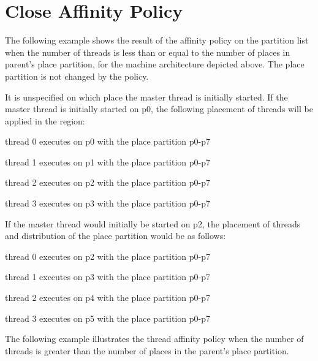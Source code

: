 \section{Close Affinity Policy}

The following example shows the result of the  affinity policy on 
the partition list when the number of threads is less than or equal to the number 
of places in parent's place partition, for the machine architecture depicted above. 
The place partition is not changed by the  policy.



It is unspecified on which place the master thread is initially started. If the 
master thread is initially started on p0, the following placement of threads will 
be applied in the  region:

\begin{compactitem}
\item thread 0 executes on p0 with the place partition p0-p7

\item thread 1 executes on p1 with the place partition p0-p7

\item thread 2 executes on p2 with the place partition p0-p7

\item thread 3 executes on p3 with the place partition p0-p7
\end{compactitem}

If the master thread would initially be started on p2, the placement of threads 
and distribution of the place partition would be as follows:

\begin{compactitem}
\item thread 0 executes on p2 with the place partition p0-p7

\item thread 1 executes on p3 with the place partition p0-p7

\item thread 2 executes on p4 with the place partition p0-p7

\item thread 3 executes on p5 with the place partition p0-p7
\end{compactitem}

The following example illustrates the  thread affinity policy when 
the number of threads is greater than the number of places in the parent's place 
partition.

